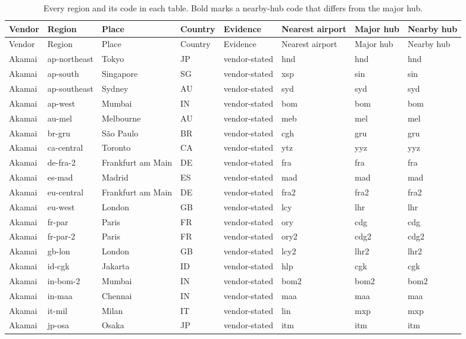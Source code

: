 \begin{longtable}{llllllll}
\caption{Every region and its code in each table. Bold marks a nearby-hub code that differs from the major hub.}\label{tab:codes}\\
\toprule
Vendor & Region & Place & Country & Evidence & Nearest airport & Major hub & Nearby hub \\
\midrule
\endfirsthead
\toprule
Vendor & Region & Place & Country & Evidence & Nearest airport & Major hub & Nearby hub \\
\midrule
\endhead
\bottomrule
\endlastfoot
Akamai & ap-northeast & Tokyo & JP & vendor-stated & hnd & hnd & hnd \\
Akamai & ap-south & Singapore & SG & vendor-stated & xsp & sin & sin \\
Akamai & ap-southeast & Sydney & AU & vendor-stated & syd & syd & syd \\
Akamai & ap-west & Mumbai & IN & vendor-stated & bom & bom & bom \\
Akamai & au-mel & Melbourne & AU & vendor-stated & meb & mel & mel \\
Akamai & br-gru & São Paulo & BR & vendor-stated & cgh & gru & gru \\
Akamai & ca-central & Toronto & CA & vendor-stated & ytz & yyz & yyz \\
Akamai & de-fra-2 & Frankfurt am Main & DE & vendor-stated & fra & fra & fra \\
Akamai & es-mad & Madrid & ES & vendor-stated & mad & mad & mad \\
Akamai & eu-central & Frankfurt am Main & DE & vendor-stated & fra2 & fra2 & fra2 \\
Akamai & eu-west & London & GB & vendor-stated & lcy & lhr & lhr \\
Akamai & fr-par & Paris & FR & vendor-stated & ory & cdg & cdg \\
Akamai & fr-par-2 & Paris & FR & vendor-stated & ory2 & cdg2 & cdg2 \\
Akamai & gb-lon & London & GB & vendor-stated & lcy2 & lhr2 & lhr2 \\
Akamai & id-cgk & Jakarta & ID & vendor-stated & hlp & cgk & cgk \\
Akamai & in-bom-2 & Mumbai & IN & vendor-stated & bom2 & bom2 & bom2 \\
Akamai & in-maa & Chennai & IN & vendor-stated & maa & maa & maa \\
Akamai & it-mil & Milan & IT & vendor-stated & lin & mxp & mxp \\
Akamai & jp-osa & Osaka & JP & vendor-stated & itm & itm & itm \\

\end{longtable}
